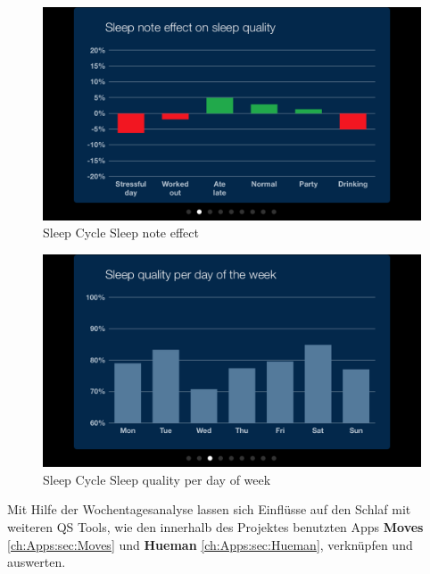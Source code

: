 \begin{figure}[]
	\centering
    \includegraphics[scale=0.5]{images/SleepCycle/SleepNoteEffectOnSleepQuality} 
    \caption{Sleep Cycle Sleep note effect}
    \label{fig:SCEffect}
\end{figure}

\begin{figure}[]
    \centering
    \includegraphics[scale=0.5]{images/SleepCycle/SleepQualityPerDayOfWeek}  
    \caption{Sleep Cycle Sleep quality per day of week}
    \label{fig:SCQualityPerDay}
\end{figure}

Mit Hilfe der Wochentagesanalyse lassen sich Einflüsse auf den Schlaf mit weiteren QS Tools, wie den innerhalb des Projektes benutzten Apps \textbf{Moves} \ref{ch:Apps:sec:Moves} und \textbf{Hueman} \ref{ch:Apps:sec:Hueman}, verknüpfen und auswerten.


